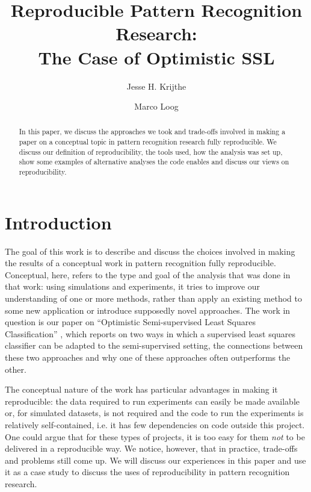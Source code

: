 \documentclass[runningheads,a4paper]{llncs}\usepackage[]{graphicx}\usepackage[]{color}
\begin{document}
\title{Reproducible Pattern Recognition Research:\\The Case of Optimistic SSL}

\author{Jesse H. Krijthe \and Marco Loog}


			
\maketitle

\begin{abstract}
In this paper, we discuss the approaches we took and trade-offs involved in making a paper on a conceptual topic in pattern recognition research fully reproducible. We discuss our definition of reproducibility, the tools used, how the analysis was set up, show some examples of alternative analyses the code enables and discuss our views on reproducibility.
\end{abstract}


\section{Introduction}
The goal of this work is to describe and discuss the choices involved in making the results of a conceptual work in pattern recognition fully reproducible. Conceptual, here, refers to the type and goal of the analysis that was done in that work: using simulations and experiments, it tries to improve our understanding of one or more methods, rather than apply an existing method to some new application or introduce supposedly novel approaches. The work in question is our paper on ``Optimistic Semi-supervised Least Squares Classification'' \cite{Krijthe2016a}, which reports on two ways in which a supervised least squares classifier can be adapted to the semi-supervised setting, the connections between these two approaches and why one of these approaches often outperforms the other.

The conceptual nature of the work has particular advantages in making it reproducible: the data required to run experiments can easily be made available or, for simulated datasets, is not required and the code to run the experiments is relatively self-contained, i.e. it has few dependencies on code outside this project. One could argue that for these types of projects, it is too easy for them \emph{not} to be delivered in a reproducible way. We notice, however, that in practice, trade-offs and problems still come up. We will discuss our experiences in this paper and use it as a case study to discuss the uses of reproducibility in pattern recognition research.
\end{document}
